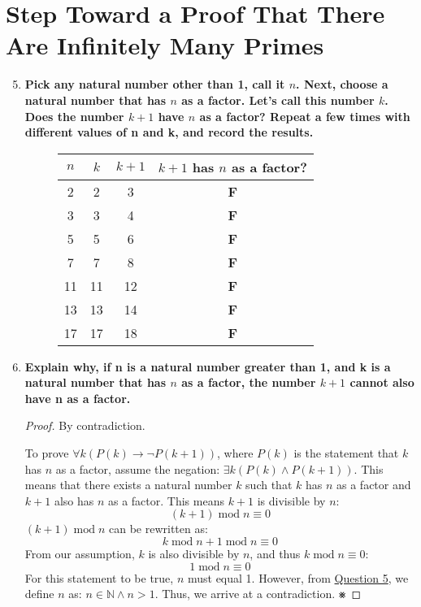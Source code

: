 \documentclass[article, 12pt]{article}
\theoremstyle{definition}
\newcommand{\Mod}[1]{\;\mathrm{mod}\; #1} %
\newcommand{\nats}{\mathbb{N}}
\begin{document}
    \section{Step Toward a Proof That There Are Infinitely Many Primes}
    \begin{enumerate}[(1)]
        \setcounter{enumi}{4}
        \item \textbf{Pick any natural number other than 1, call it $n$. Next, choose a natural number that has $n$ as a factor. Let’s call this number $k$. Does the number $k + 1$ have $n$ as a factor? Repeat a few times with different values of n and k, and record the results.}\label{question:list n and k and k + 1}
        \begin{figure}[H]
            \centering
            \begin{tabular}{|c|c|c|c|}
                \hline
                $n$ & $k$ & $k + 1$ & $k + 1$ has $n$ as a factor? \\
                \hline
                2 & 2 & 3 & \textbf{F} \\
                3 & 3 & 4 & \textbf{F} \\
                5 & 5 & 6 & \textbf{F} \\
                7 & 7 & 8 & \textbf{F} \\
                11 & 11 & 12 & \textbf{F} \\
                13 & 13 & 14 & \textbf{F} \\
                17 & 17 & 18 & \textbf{F} \\
                \hline
            \end{tabular}
        \end{figure}        
        \item \textbf{Explain why, if n is a natural number greater than 1, and k is a natural number that has $n$ as a factor, the number $k + 1$ cannot also have n as a factor.}\label{question:k + 1 cannot have n as a factor}
        \begin{proof}
            By contradiction. 
            
            To prove $\forall k(P(k) \to \neg P(k+1))$, where $P(k)$ is the statement that $k$ has $n$ as a factor, assume the negation: $\exists k (P(k) \land P(k+1))$. This means that there exists a natural number $k$ such that $k$ has $n$ as a factor and $k+1$ also has $n$ as a factor. This means $k+1$ is divisible by $n$: 
            \[ (k+1) \Mod{n} \equiv 0 \]
            $(k+1) \Mod{n}$ can be rewritten as:
            \[ k \Mod{n} + 1 \Mod{n} \equiv 0 \]
            From our assumption, $k$ is also divisible by $n$, and thus $k \Mod{n} \equiv 0$:
            \[ 1 \Mod{n} \equiv 0 \]
            For this statement to be true, $n$ must equal 1. However, from \hyperref[question:list n and k and k + 1]{Question 5}, we define $n$ as: $n \in \nats \land n > 1$. Thus, we arrive at a contradiction. $\smashtimes$ 
            

\end{proof}
\end{enumerate}
\end{document}
